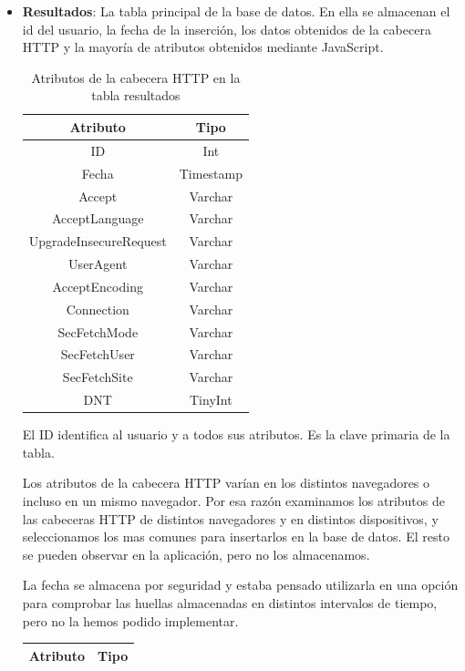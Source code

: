 \begin{itemize}
    \item \textbf{Resultados}: La tabla principal de la base de datos. En ella se almacenan el id del usuario, la fecha de la inserción, los datos obtenidos de la cabecera HTTP y la mayoría de atributos obtenidos mediante JavaScript.
    \begin{table}[H]
        \centering
        \begin{tabular}{c|c}
            Atributo & Tipo \\ \hline
            ID & Int \\
            Fecha & Timestamp \\
            Accept & Varchar\\
            AcceptLanguage & Varchar\\
            UpgradeInsecureRequest & Varchar\\
            UserAgent & Varchar\\
            AcceptEncoding & Varchar\\
            Connection & Varchar\\
            SecFetchMode & Varchar\\
            SecFetchUser & Varchar\\
            SecFetchSite & Varchar\\
            DNT & TinyInt\\
        \end{tabular}
        \caption{Atributos de la cabecera HTTP en la tabla resultados}
        \label{tab:resultadosHTTP}
    \end{table}
    El ID identifica al usuario y a todos sus atributos. Es la clave primaria de la tabla.\par
    Los atributos de la cabecera HTTP varían en los distintos navegadores o incluso en un mismo navegador. Por esa razón examinamos los atributos de las cabeceras HTTP de distintos navegadores y en distintos dispositivos, y seleccionamos los mas comunes para insertarlos en la base de datos. El resto se pueden observar en la aplicación, pero no los almacenamos.\par
    La fecha se almacena por seguridad y estaba pensado utilizarla en una opción para comprobar las huellas almacenadas en distintos intervalos de tiempo, pero no la hemos podido implementar.
    \begin{table}[H]
        \centering
        \begin{tabular}{c|c}
            Atributo & Tipo \\ \hline

\end{tabular}
\end{table}
\end{itemize}
